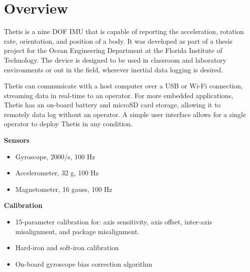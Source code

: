 \section{Overview}

\begin{multicols}{2}

Thetis is a nine \ac{DOF} \ac{IMU} that is capable of reporting the acceleration, rotation rate, orientation, and position of a body.
It was developed as part of a thesis project for the Ocean Engineering Department at the Florida Institute of Technology.
The device is designed to be used in classroom and laboratory environments or out in the field, wherever inertial data logging is desired.

Thetis can communicate with a host computer over a \acs{USB} or Wi-Fi connection, streaming data in real-time to an operator.
For more embedded applications, Thetis has an on-board battery and \acs{microSD} card storage, allowing it to remotely data log without an operator.
A simple user interface allows for a single operator to deploy Thetis in any condition.

\textbf{Sensors}
\begin{itemize}[nolistsep]
    \item Gyroscope, \textpm{}2000\textdegree{}/s, 100 Hz
    \item Accelerometer, \textpm{}32 g, 100 Hz
    \item Magnetometer, \textpm{}16 gauss, 100 Hz
\end{itemize}

\textbf{Calibration}
\begin{itemize}[nolistsep]
    \item 15-parameter calibration for: axis sensitivity, axis offset, inter-axis misalignment, and package misalignment.
    \item Hard-iron and soft-iron calibration
    \item On-board gyroscope bias correction algorithm
\end{itemize}


\end{multicols}
